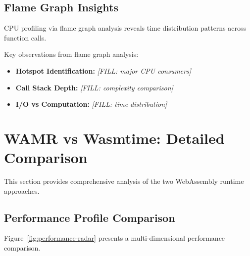\subsection{Flame Graph Insights}
\label{subsec:flamegraph-analysis}

CPU profiling via flame graph analysis reveals time distribution patterns across function calls.


Key observations from flame graph analysis:
\begin{itemize}
    \item \textbf{Hotspot Identification:} \textit{[FILL: major CPU consumers]}
    \item \textbf{Call Stack Depth:} \textit{[FILL: complexity comparison]}
    \item \textbf{I/O vs Computation:} \textit{[FILL: time distribution]}
\end{itemize}

\section{WAMR vs Wasmtime: Detailed Comparison}
\label{sec:detailed-comparison}

This section provides comprehensive analysis of the two WebAssembly runtime approaches.

\subsection{Performance Profile Comparison}
\label{subsec:performance-profiles}

Figure~\ref{fig:performance-radar} presents a multi-dimensional performance comparison.


